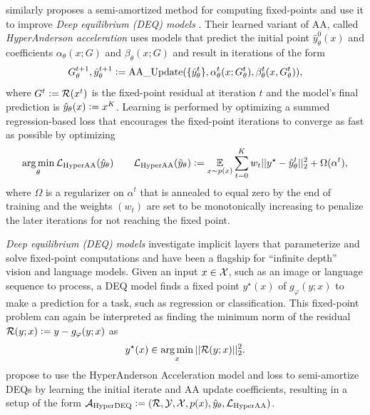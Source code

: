 \documentclass[twoside,11pt]{article}
\begin{document}
\citet{bai2022neural} similarly proposes a semi-amortized
method for computing fixed-points and use it to
improve \emph{Deep equilibrium (DEQ) models}
\citep{bai2019deep,bai2020multiscale,gurumurthy2021joint}.
Their learned variant of AA, called \emph{HyperAnderson acceleration}
uses models that predict the initial point $\hat y^0_\theta(x)$
and coefficients $\alpha_\theta(x; G)$ and $\beta_\theta(x; G)$
and result in iterations of the form
\begin{equation}
  G^{t+1}_\theta, \hat y^{t+1}_\theta \vcentcolon=
  {\rm AA\_Update}(\{\hat y^t_\theta\},
    \alpha^t_\theta(x; G^t_\theta), \beta^t_\theta(x, G^t_\theta)),
  \label{eq:hyperaa}
\end{equation}
where $G^t\vcentcolon= {\mathcal{R}}(x^t)$ is the fixed-point residual at
iteration $t$ and the model's final prediction is
$\hat y_\theta(x)\vcentcolon= x^K$.
Learning is performed by optimizing a summed regression-based loss
that encourages the fixed-point iterations to converge
as fast as possible by optimizing
\begin{equation}
  \operatorname*{arg\,min}_\theta {\mathcal{L}}_{\rm HyperAA}(\hat y_\theta) \qquad {\mathcal{L}}_{\rm HyperAA}(\hat y_\theta) \vcentcolon= \operatorname*{\mathbb{E}}_{x\sim p(x)} \sum_{t=0}^K w_t ||y^\star - \hat y_\theta^t||_2^2 + \Omega(\alpha^t),
  \label{eq:hyperaa-loss}
\end{equation}
where $\Omega$ is a regularizer on $\alpha^t$ that is annealed
to equal zero by the end of training and the
weights $(w_t)$ are set to be monotonically increasing to
penalize the later iterations for not reaching the fixed point.

\emph{Deep equilibrium (DEQ) models} \citep{bai2019deep,bai2020multiscale}
investigate implicit layers that parameterize and solve
fixed-point computations and have been a flagship for
``infinite depth'' vision and language models.
Given an input $x\in{\mathcal{X}}$, such as an image or language sequence
to process, a DEQ model finds a fixed point $y^\star(x)$
of $g_\varphi(y; x)$ to make a prediction for a task,
such as regression or classification.
This fixed-point problem can again be interpreted as
finding the minimum norm of the residual
${\mathcal{R}}(y; x)\vcentcolon= y-g_\varphi(y;x)$
as
\begin{equation}
  y^\star(x)\in \operatorname*{arg\,min}_x ||{\mathcal{R}}(y; x)||_2^2.
  \label{eq:deq-opt}
\end{equation}
\citet{bai2022neural} propose to use the HyperAnderson Acceleration
model and loss to semi-amortize DEQs by learning the initial
iterate and AA update coefficients, resulting in a setup of the form
${\mathcal{A}}_{\rm HyperDEQ}\vcentcolon=({\mathcal{R}}, {\mathcal{Y}}, {\mathcal{X}}, p(x), \hat y_\theta, {\mathcal{L}}_{\rm HyperAA})$.
\end{document}
